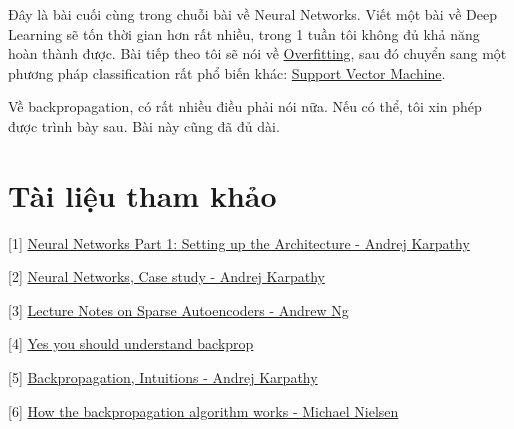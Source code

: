 \item Đây là bài cuối cùng trong chuỗi bài về Neural Networks. Viết một bài về Deep Learning sẽ tốn thời gian hơn rất nhiều, trong 1 tuần tôi không đủ khả năng hoàn thành được. Bài tiếp theo tôi sẽ nói về \href{https://en.wikipedia.org/wiki/Overfitting}{Overfitting}, sau đó chuyển sang một phương pháp classification rất phổ biến khác: \href{https://en.wikipedia.org/wiki/Support_vector_machine}{Support Vector Machine}. 
 
\item Về backpropagation, có rất nhiều điều phải nói nữa. Nếu có thể, tôi xin phép được trình bày sau. Bài này cũng đã đủ dài. 
 
 
 
\section{Tài liệu tham khảo}
 
[1] \href{http://cs231n.github.io/neural-networks-1/}{Neural Networks Part 1: Setting up the Architecture - Andrej Karpathy} 
 
[2] \href{http://cs231n.github.io/neural-networks-case-study/}{Neural Networks, Case study - Andrej Karpathy} 
 
[3] \href{https://web.stanford.edu/class/cs294a/sparseAutoencoder_2011new.pdf}{Lecture Notes on Sparse Autoencoders - Andrew Ng} 
 
[4] \href{https://medium.com/@karpathy/yes-you-should-understand-backprop-e2f06eab496b#.g76s9xxzc}{Yes you should understand backprop} 
 
[5] \href{http://cs231n.github.io/optimization-2/}{Backpropagation, Intuitions - Andrej Karpathy} 
 
[6] \href{http://neuralnetworksanddeeplearning.com/chap2.html}{How the backpropagation algorithm works - Michael Nielsen } 
